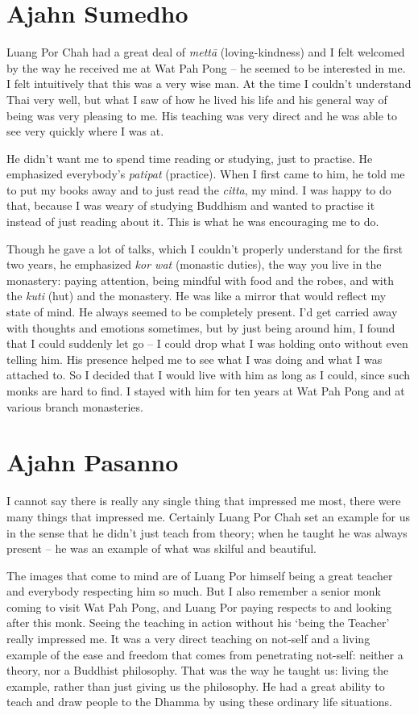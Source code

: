 
\section{Ajahn Sumedho}

Luang Por Chah had a great deal of \emph{mettā} (loving-kindness) and I
felt welcomed by the way he received me at Wat Pah Pong -- he seemed to
be interested in me. I felt intuitively that this was a very wise man.
At the time I couldn't understand Thai very well, but what I saw of how
he lived his life and his general way of being was very pleasing to me.
His teaching was very direct and he was able to see very quickly where I
was at.

He didn't want me to spend time reading or studying, just to practise.
He emphasized everybody's \emph{patipat} (practice). When I first came
to him, he told me to put my books away and to just read the
\emph{citta}, my mind. I was happy to do that, because I was weary of
studying Buddhism and wanted to practise it instead of just reading
about it. This is what he was encouraging me to do.

Though he gave a lot of talks, which I couldn't properly understand for
the first two years, he emphasized \emph{kor wat} (monastic duties), the
way you live in the monastery: paying attention, being mindful with food
and the robes, and with the \emph{kuti} (hut) and the monastery. He was
like a mirror that would reflect my state of mind. He always seemed to
be completely present. I'd get carried away with thoughts and emotions
sometimes, but by just being around him, I found that I could suddenly
let go -- I could drop what I was holding onto without even telling him.
His presence helped me to see what I was doing and what I was attached
to. So I decided that I would live with him as long as I could, since
such monks are hard to find. I stayed with him for ten years at Wat Pah
Pong and at various branch monasteries.

\section{Ajahn Pasanno}

I cannot say there is really any single thing that impressed me most,
there were many things that impressed me. Certainly Luang Por Chah set
an example for us in the sense that he didn't just teach from theory;
when he taught he was always present -- he was an example of what was
skilful and beautiful.

The images that come to mind are of Luang Por himself being a great
teacher and everybody respecting him so much. But I also remember a
senior monk coming to visit Wat Pah Pong, and Luang Por paying respects
to and looking after this monk. Seeing the teaching in action without
his `being the Teacher' really impressed me. It was a very direct
teaching on not-self and a living example of the ease and freedom that
comes from penetrating not-self: neither a theory, nor a Buddhist
philosophy. That was the way he taught us: living the example, rather
than just giving us the philosophy. He had a great ability to teach and
draw people to the Dhamma by using these ordinary life situations.

